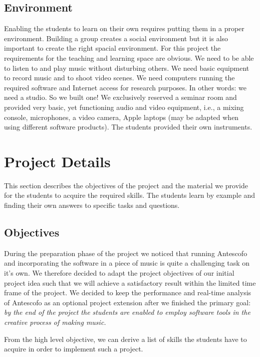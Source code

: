 \documentclass[onecolumn,nocopyrightspace,preprint]{sigplanconf}
\begin{document}
\subsection{Environment}

Enabling the students to learn on their own requires putting them in a proper
environment. Building a group creates a social environment but it is also
important to create the right spacial environment. For this project the
requirements for the teaching and learning space are obvious. We need to be
able to listen to and play music without disturbing others. We need basic
equipment to record music and to shoot video scenes. We need computers running
the required software and  Internet access for research purposes. In other
words: we need a studio. So we built one! We exclusively reserved a seminar
room and provided very basic, yet functioning audio and video equipment, i.e.,
a mixing console, microphones, a video camera, Apple laptops (may be adapted
when using different software products). The students provided their own
instruments.



\section{Project Details}\label{sec:objectives}

This section describes the objectives of the project and the material we
provide for the students to acquire the required skills. The students learn by
example and finding their own answers to specific tasks and questions.

\subsection{Objectives}

During the preparation phase of the project we noticed that running Antescofo
and incorporating the software in a piece of music is quite a challenging task
on it's own. We therefore decided to adapt the project objectives of our initial
project idea such that we will achieve a satisfactory result within the limited time
frame of the project. We decided to keep the performance and real-time analysis of
Antescofo as an optional project extension after we finished the primary goal:
\textit{by the end of the project the students are enabled to employ software
tools in the creative process of making music.}

From the high level objective, we can derive a list of skills the students
have to acquire in order to implement such a project.
\end{document}
